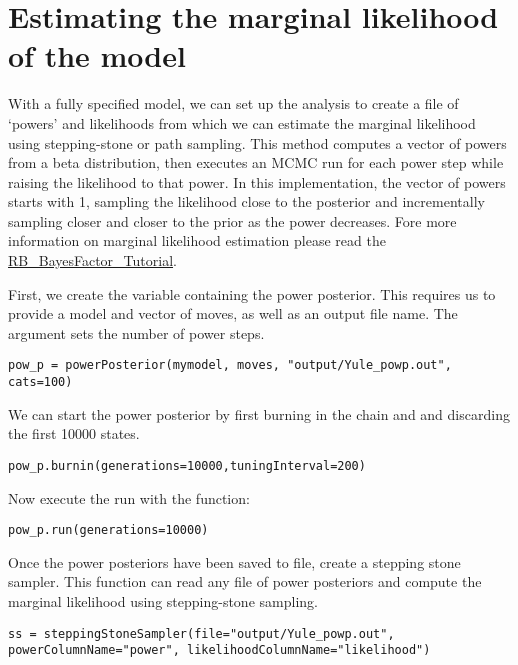 \section{Estimating the marginal likelihood of the model}

With a fully specified model, we can set up the  analysis to create a file of `powers' and likelihoods from which we can estimate the marginal likelihood using stepping-stone or path sampling. 
This method computes a vector of powers from a beta distribution, then executes an MCMC run for each power step while raising the likelihood to that power. In this implementation, the vector of powers starts with 1, sampling the likelihood close to the posterior and incrementally sampling closer and closer to the prior as the power decreases. 
Fore more information on marginal likelihood estimation please read the \href{https://github.com/revbayes/revbayes_tutorial/raw/master/tutorial_TeX/RB_BayesFactor_Tutorial/RB_BayesFactor_Tutorial.pdf}{RB\_BayesFactor\_Tutorial}.

First, we create the variable containing the power posterior. 
This requires us to provide a model and vector of moves, as well as an output file name. 
The  argument sets the number of power steps.
{\tt \begin{snugshade*}
\begin{lstlisting}
pow_p = powerPosterior(mymodel, moves, "output/Yule_powp.out", cats=100) 
\end{lstlisting}
\end{snugshade*}}

We can start the power posterior by first burning in the chain and and discarding the first 10000 states.  
{\tt \begin{snugshade*}
\begin{lstlisting}
pow_p.burnin(generations=10000,tuningInterval=200)
\end{lstlisting}
\end{snugshade*}}

Now execute the run with the  function:
{\tt \begin{snugshade*}
\begin{lstlisting}
pow_p.run(generations=10000)  
\end{lstlisting}
\end{snugshade*}}

Once the power posteriors have been saved to file, create a stepping stone sampler. 
This function can read any file of power posteriors and compute the marginal likelihood using stepping-stone sampling. 
{\tt \small \begin{snugshade*}
\begin{lstlisting}
ss = steppingStoneSampler(file="output/Yule_powp.out", powerColumnName="power", likelihoodColumnName="likelihood")
\end{lstlisting}
\end{snugshade*}}

